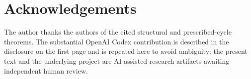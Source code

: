 \documentclass[11pt]{article}
\theoremstyle{definition}
\theoremstyle{remark}
\begin{document}
\section*{Acknowledgements}

The author thanks the authors of the cited structural and
prescribed-cycle theorems.  The substantial OpenAI Codex contribution
is described in the disclosure on the first page and is repeated here
to avoid ambiguity: the present text and the underlying project are
AI-assisted research artifacts awaiting independent human review.



\end{document}

